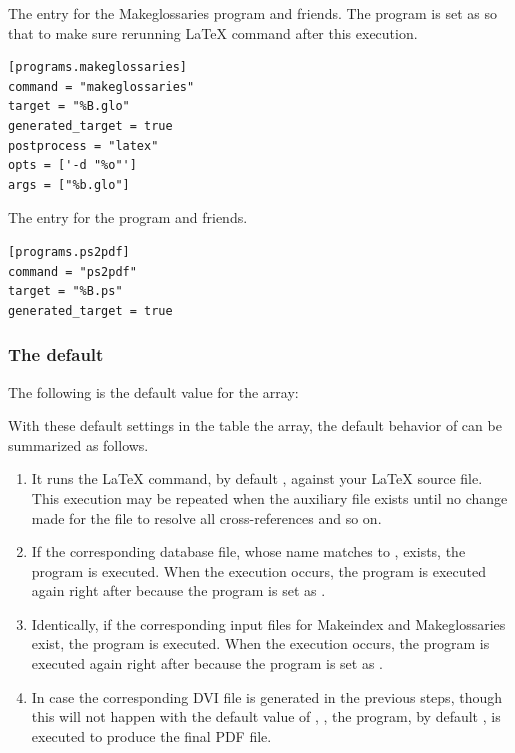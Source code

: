 \documentclass{llmk-doc}
\begin{document}
 The entry for the Makeglossaries program and friends. The
 program is set as  so that to make sure
rerunning {\LaTeX} command after this execution.
%
\begin{lstlisting}[style=toml]
[programs.makeglossaries]
command = "makeglossaries"
target = "%B.glo"
generated_target = true
postprocess = "latex"
opts = ['-d "%o"']
args = ["%b.glo"]
\end{lstlisting}

 The entry for the  program and friends.
%
\begin{lstlisting}[style=toml]
[programs.ps2pdf]
command = "ps2pdf"
target = "%B.ps"
generated_target = true
\end{lstlisting}

\subsubsection{The default }
\label{sec:default-sequence}

The following is the default value for the  array:
%
\begin{htcode}
\end{htcode}

With these default settings in the  table the 
array, the default behavior of  can be summarized as follows.
%
\begin{enumerate}
\item It runs the {\LaTeX} command, by default {\LuaLaTeX}, against your
  {\LaTeX} source file. This execution may be repeated when the auxiliary file
  exists until no change made for the file to resolve all cross-references and
  so on.
\item If the corresponding {\BibTeX} database file, whose name matches to
  , exists, the {\BibTeX} program is executed. When the execution
  occurs, the  program is executed again right after because
  the program is set as .
\item Identically, if the corresponding input files for Makeindex and
  Makeglossaries exist, the program is executed. When the execution occurs,
  the  program is executed again right after because the
  program is set as .
\item In case the corresponding DVI file is generated in the previous steps,
  though this will not happen with the default value of , \ie
  , the  program, by default ,
  is executed to produce the final PDF file.
\end{enumerate}
\end{document}
